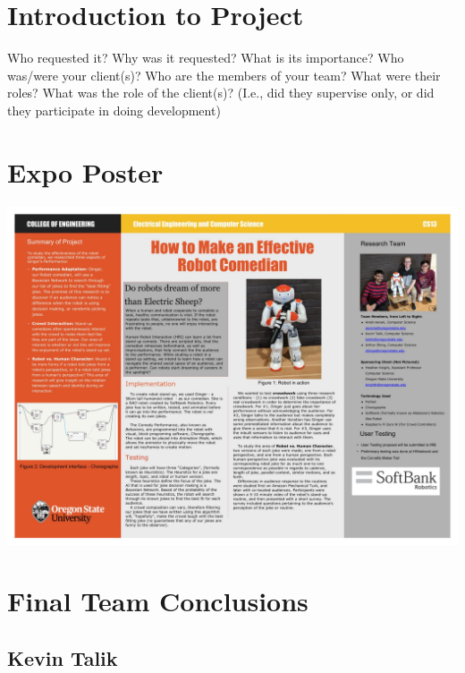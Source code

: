 \documentclass[onecolumn, draftclsnofoot,10pt, compsoc]{IEEEtran}
\begin{document}
\section{Introduction to Project}
Who requested it?
Why was it requested?
What is its importance?
Who was/were your client(s)?
Who are the members of your team?
What were their roles?
What was the role of the client(s)? (I.e., did they supervise only, or did they participate in doing development)














\section{Expo Poster}
\includegraphics[width=\paperwidth, angle=90]{poster.jpg}
\pagebreak

        

\pagebreak
\section{Final Team Conclusions}
\subsection{Kevin Talik}
\end{document}
